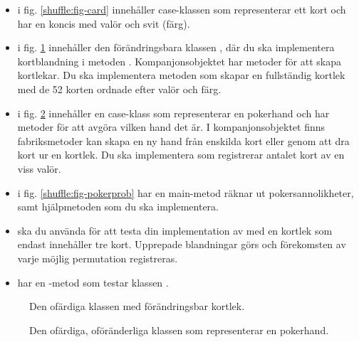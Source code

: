 \begin{itemize}
\item {} i fig. \ref{shuffle:fig-card} innehåller case-klassen  som representerar ett kort och har en koncis  med valör och svit (färg). 

\item {} i fig. \ref{shuffle:fig-deck} innehåller den förändringsbara klassen , där du ska implementera kortblandning i metoden . Kompanjonsobjektet har metoder för att skapa kortlekar. Du ska implementera metoden  som skapar en fullständig kortlek med de 52 korten ordnade efter valör och färg.

\item {} i fig. \ref{shuffle:fig-hand} innehåller en case-klass  som representerar en pokerhand och har metoder för att avgöra vilken hand det är. I kompanjonsobjektet finns fabriksmetoder kan skapa en ny hand från enskilda kort eller genom att dra kort ur en kortlek. Du ska implementera  som registrerar antalet kort av en viss valör. 

\item {} i fig. \ref{shuffle:fig-pokerprob}  har en main-metod räknar ut pokersannolikheter, samt hjälpmetoden  som du ska implementera.

\item {} ska du använda för att testa din implementation av  med en kortlek som endast innehåller tre kort. Upprepade blandningar görs och förekomsten av varje möjlig permutation  registreras.

\item {} har en -metod som testar klassen .

\end{itemize}

\begin{figure}
\caption{Den ofärdiga klassen  med förändringsbar kortlek.}
\label{shuffle:fig-deck}
\end{figure}

\begin{figure}
\caption{Den ofärdiga, oföränderliga klassen  som representerar en pokerhand.}
\label{shuffle:fig-hand}
\end{figure}

